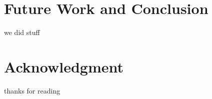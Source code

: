\section{Future Work and Conclusion}
\label{sec:future}

we did stuff

\section*{Acknowledgment}

thanks for reading
